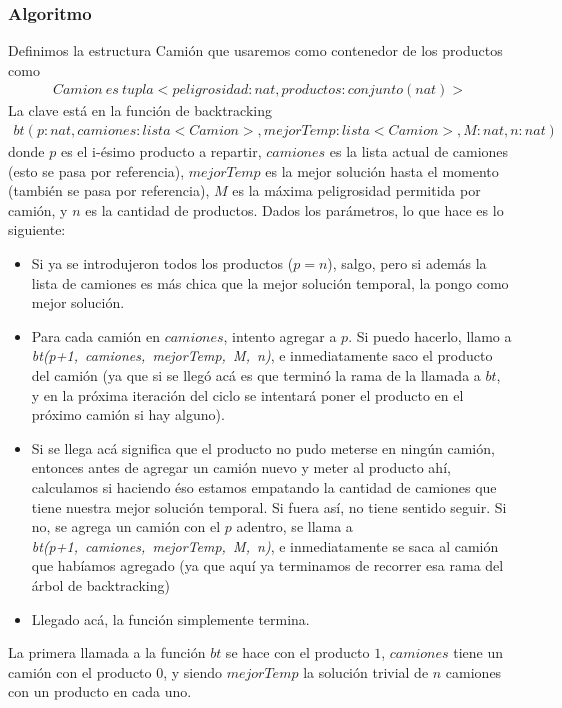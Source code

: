 \subsubsection{Algoritmo}
Definimos la estructura Camión que usaremos como contenedor de los productos como
\begin{align*}
Camion \: es \: tupla<peligrosidad : nat, productos : conjunto(nat)>
\end{align*}
La clave está en la función de backtracking %
\begin{align*}
bt(p : nat, camiones : lista<Camion>, mejorTemp : lista<Camion>, M : nat, n : nat)
\end{align*}
donde $p$ es el i-ésimo producto a repartir, $camiones$ es la lista actual de camiones (esto se pasa por referencia), $mejorTemp$ es la mejor solución hasta el momento (también se pasa por referencia), $M$ es la máxima peligrosidad permitida por camión, y $n$ es la cantidad de productos.
Dados los parámetros, lo que hace es lo siguiente: 
\begin{itemize}
\item Si ya se introdujeron todos los productos ($p = n$), salgo, pero si además la lista de camiones es más chica que la mejor solución temporal, la pongo como mejor solución.
\item Para cada camión en $camiones$, intento agregar a $p$. Si puedo hacerlo, llamo a \textit{bt(p+1,~camiones,~mejorTemp,~M,~n)}, e inmediatamente saco el producto del camión (ya que si se llegó acá es que terminó la rama de la llamada a $bt$, y en la próxima iteración del ciclo se intentará poner el producto en el próximo camión si hay alguno).
\item Si se llega acá significa que el producto no pudo meterse en ningún camión, entonces antes de agregar un camión nuevo y meter al producto ahí, calculamos si haciendo éso estamos empatando la cantidad de camiones que tiene nuestra mejor solución temporal. Si fuera así, no tiene sentido seguir. Si no, se agrega un camión con el $p$ adentro, se llama a \textit{bt(p+1,~camiones,~mejorTemp,~M,~n)}, e inmediatamente se saca al camión que habíamos agregado (ya que aquí ya terminamos de recorrer esa rama del árbol de backtracking)
\item Llegado acá, la función simplemente termina.
\end{itemize}
La primera llamada a la función $bt$ se hace con el producto $1$, $camiones$ tiene un camión con el producto $0$, y siendo $mejorTemp$ la solución trivial de $n$ camiones con un producto en cada uno.


